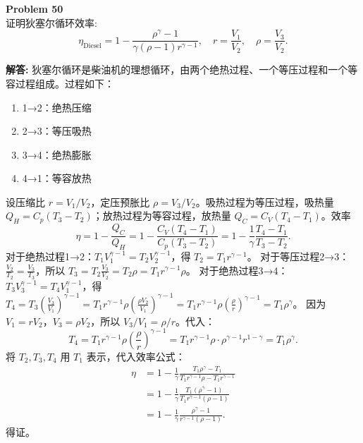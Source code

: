 \documentclass[12pt, a4paper, oneside]{ctexart}
\newenvironment{solution}{\par\noindent\textbf{解答:}\quad}{\par}
\begin{document}
\begin{mdframed}[backgroundcolor=gray!10, linewidth=0pt]
    \textbf{Problem 50} \\
    证明狄塞尔循环效率:
    \[
    \eta_{\text{Diesel}} = 1 - \frac{\rho^\gamma - 1}{\gamma (\rho - 1) r^{\gamma-1}}, \quad r = \frac{V_1}{V_2}, \quad \rho = \frac{V_3}{V_2}.
    \]
\end{mdframed}
\begin{solution}
    狄塞尔循环是柴油机的理想循环，由两个绝热过程、一个等压过程和一个等容过程组成。过程如下：
    \begin{enumerate}
        \item 1→2：绝热压缩
        \item 2→3：等压吸热
        \item 3→4：绝热膨胀
        \item 4→1：等容放热
    \end{enumerate}
    设压缩比 $r = V_1 / V_2$，定压预胀比 $\rho = V_3 / V_2$。吸热过程为等压过程，吸热量 $Q_H = C_p (T_3 - T_2)$；放热过程为等容过程，放热量 $Q_C = C_V (T_4 - T_1)$。效率
    \[
    \eta = 1 - \frac{Q_C}{Q_H} = 1 - \frac{C_V (T_4 - T_1)}{C_p (T_3 - T_2)} = 1 - \frac{1}{\gamma} \frac{T_4 - T_1}{T_3 - T_2}.
    \]
    对于绝热过程1→2：$T_1 V_1^{\gamma-1} = T_2 V_2^{\gamma-1}$，得 $T_2 = T_1 r^{\gamma-1}$。
    对于等压过程2→3：$\frac{V_2}{T_2} = \frac{V_3}{T_3}$，所以 $T_3 = T_2 \frac{V_3}{V_2} = T_2 \rho = T_1 r^{\gamma-1} \rho$。
    对于绝热过程3→4：$T_3 V_3^{\gamma-1} = T_4 V_1^{\gamma-1}$，得 $T_4 = T_3 \left(\frac{V_3}{V_1}\right)^{\gamma-1} = T_1 r^{\gamma-1} \rho \left(\frac{\rho V_2}{V_1}\right)^{\gamma-1} = T_1 r^{\gamma-1} \rho \left(\frac{\rho}{r}\right)^{\gamma-1} = T_1 \rho^\gamma$。
    因为 $V_1 = r V_2$，$V_3 = \rho V_2$，所以 $V_3 / V_1 = \rho / r$。代入：
    \[
    T_4 = T_1 r^{\gamma-1} \rho \left(\frac{\rho}{r}\right)^{\gamma-1} = T_1 r^{\gamma-1} \rho \cdot \rho^{\gamma-1} r^{1-\gamma} = T_1 \rho^\gamma.
    \]
    将 $T_2, T_3, T_4$ 用 $T_1$ 表示，代入效率公式：
    \begin{align*}
        \eta &= 1 - \frac{1}{\gamma} \frac{T_1 \rho^\gamma - T_1}{T_1 r^{\gamma-1} \rho - T_1 r^{\gamma-1}} \\
        &= 1 - \frac{1}{\gamma} \frac{T_1 (\rho^\gamma - 1)}{T_1 r^{\gamma-1} (\rho - 1)} \\
        &= 1 - \frac{1}{\gamma} \frac{\rho^\gamma - 1}{r^{\gamma-1} (\rho - 1)}.
    \end{align*}
    得证。
\end{solution}
\end{document}
